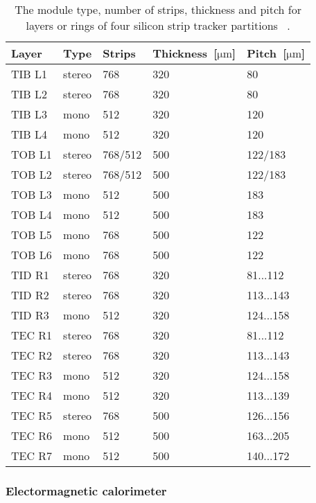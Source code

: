 \begin{table}[h]
\begin{center}
\begin{tabular}{|l|l|l|l|l|}
\hline
Layer & Type  & Strips & Thickness~[$\mathrm{\mu m}$] & Pitch~[$\mathrm{\mu m}$]  \\
\hline
\hline
TIB L1 & stereo & 768 & 320 & 80  \\
TIB L2 & stereo & 768 & 320 & 80  \\
TIB L3 & mono & 512 & 320 & 120  \\
TIB L4 & mono & 512 & 320 & 120 \\
\hline
TOB L1 & stereo & 768/512 & 500 & 122/183 \\
TOB L2 & stereo & 768/512 & 500 & 122/183 \\
TOB L3 & mono & 512 & 500 & 183 \\
TOB L4 & mono & 512 & 500 & 183 \\
TOB L5 & mono & 768 & 500 & 122 \\
TOB L6 & mono & 768 & 500 & 122 \\
\hline
TID R1 & stereo & 768 & 320 & 81...112  \\
TID R2 & stereo & 768 & 320 & 113...143  \\
TID R3 & mono & 512 & 320 & 124...158  \\
\hline
TEC R1 & stereo & 768 & 320 & 81...112  \\
TEC R2 & stereo & 768 & 320 & 113...143  \\
TEC R3 & mono & 512 & 320 & 124...158  \\
TEC R4 & mono & 512 & 320 & 113...139  \\
TEC R5 & stereo & 768 & 500 & 126...156  \\
TEC R6 & mono & 512 & 500 & 163...205  \\
TEC R7 & mono & 512 & 500 & 140...172  \\
\hline
\end{tabular}
\caption[Table caption text]{The module type, number of strips, thickness and pitch for layers or rings of four silicon strip tracker partitions ~\cite{website:hephyPage}. }
\label{tab:trackerGeometries}
\end{center}
\end{table}



\subsubsection{Electormagnetic calorimeter}

